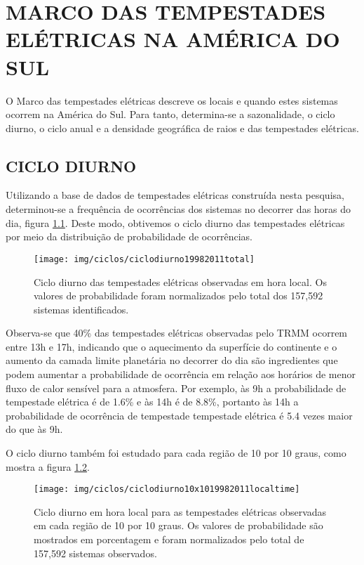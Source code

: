 \chapter{MARCO DAS TEMPESTADES ELÉTRICAS NA AMÉRICA DO SUL}

O Marco das tempestades elétricas descreve os locais e quando estes sistemas ocorrem na América do Sul. Para tanto, determina-se a sazonalidade, o ciclo diurno, o ciclo anual e a densidade geográfica de raios e das tempestades elétricas.

\section{CICLO DIURNO}

Utilizando a base de dados de tempestades elétricas construída nesta pesquisa, determinou-se a frequência de ocorrências dos sistemas no decorrer das horas do dia, figura \ref{ciclodiurnototal}. Deste modo, obtivemos o ciclo diurno das tempestades elétricas por meio da distribuição de probabilidade de ocorrências.

\begin{figure}[!hb]
  \centering
  {{\texttt{[image: img/ciclos/ciclodiurno19982011total]}}}
\caption{Ciclo diurno das tempestades elétricas observadas em hora local. Os valores de probabilidade foram normalizados pelo total dos 157,592 sistemas identificados.}
\label{ciclodiurnototal}
\end{figure} 

Observa-se que 40\%  das tempestades elétricas observadas pelo TRMM ocorrem entre 13h e 17h, indicando que o aquecimento da superfície do continente e o aumento da camada limite planetária no decorrer do dia são ingredientes que podem aumentar a probabilidade de ocorrência em  relação aos horários de menor fluxo de calor sensível para a atmosfera. Por exemplo, às 9h a probabilidade de tempestade elétrica é de 1.6\% e às 14h é de 8.8\%, portanto às 14h a probabilidade de ocorrência de tempestade tempestade elétrica é 5.4 vezes maior do que às 9h.


O ciclo diurno também foi estudado para cada região de 10 por 10 graus, como mostra a figura \ref{diurno}. 

\begin{figure}[!hb]
\centering
{\texttt{[image: img/ciclos/ciclodiurno10x1019982011localtime]}}  
\caption{Ciclo diurno em hora local para as tempestades elétricas observadas em cada região de 10 por 10 graus. Os valores de probabilidade são mostrados em porcentagem e foram normalizados pelo total de 157,592 sistemas observados.}
\label{diurno}
\end{figure}

